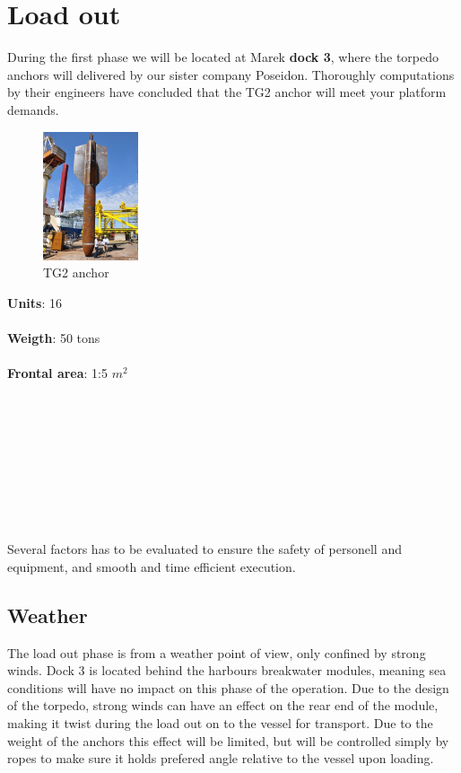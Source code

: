 \documentclass[a4paper,norsk]{article}
\begin{document}
\section*{Load out}
During the first phase we will be located at Marek \textbf{dock 3}, where the torpedo anchors will delivered by our sister company Poseidon.
Thoroughly computations by their engineers have concluded that the TG2 anchor will meet your platform demands.
\\ 
\begin{figure}
  \vspace{-20pt}
  \begin{center}
    \includegraphics[width=0.25\textwidth]{tt2.jpg}
  \end{center} 
  \vspace{-20pt}
  \caption{TG2 anchor}
  \vspace{-10pt}
\end{figure}
\textbf{Units}: 16  \\ \\ \textbf{Weigth}: 50 tons \\ \\  \textbf{Frontal area}: 1:5 $m^2$
\\ \\ \\ \\ \\ \\ \\ \\ \\ \\ 
Several factors  has to be evaluated to ensure the safety of personell and equipment, and smooth and time efficient execution.
\subsection*{Weather}
The load out phase is from a weather point of view, only confined by strong winds. Dock 3 is located behind the harbours breakwater modules, meaning sea conditions will have no impact on this phase of the operation. Due to the design of the torpedo, strong winds can have an effect on the rear end of the module, making it twist during the load out on to the vessel for transport. Due to the weight of the anchors this effect will be limited, but will be controlled simply by ropes to make sure it holds prefered angle relative to the vessel upon loading.
\end{document}
